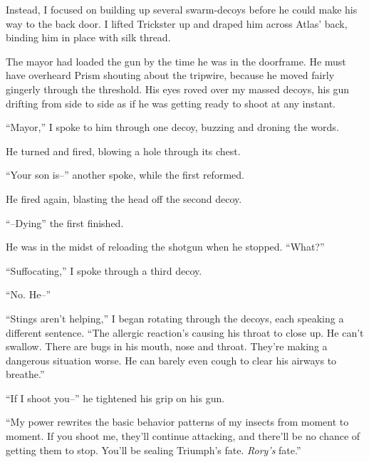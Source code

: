 Instead, I focused on building up several swarm-decoys before he could make his way to the back door.  I lifted Trickster up and draped him across Atlas' back, binding him in place with silk thread.



The mayor had loaded the gun by the time he was in the doorframe.  He must have overheard Prism shouting about the tripwire, because he moved fairly gingerly through the threshold.  His eyes roved over my massed decoys, his gun drifting from side to side as if he was getting ready to shoot at any instant.



``Mayor,'' I spoke to him through one decoy, buzzing and droning the words.



He turned and fired, blowing a hole through its chest.



``Your son is--'' another spoke, while the first reformed.



He fired again, blasting the head off the second decoy.



``--Dying'' the first finished.



He was in the midst of reloading the shotgun when he stopped.  ``What?''



``Suffocating,'' I spoke through a third decoy.



``No.  He--''



``Stings aren't helping,'' I began rotating through the decoys, each speaking a different sentence.  ``The allergic reaction's causing his throat to close up.  He can't swallow.  There are bugs in his mouth, nose and throat.  They're making a dangerous situation worse.  He can barely even cough to clear his airways to breathe.''



``If I shoot you--'' he tightened his grip on his gun.



``My power rewrites the basic behavior patterns of my insects from moment to moment.  If you shoot me, they'll continue attacking, and there'll be no chance of getting them to stop.  You'll be sealing Triumph's fate.  \emph{Rory's }fate.''



